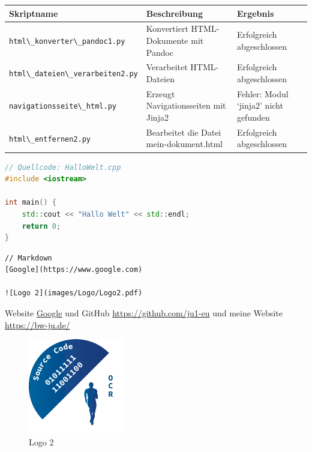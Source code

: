 \documentclass{vorlage-design-main}
\begin{document}
\begin{table}[ht]
  \begin{tabular}{@{}lll@{}}
\toprule
Skriptname
 & 
Beschreibung
 & 
Ergebnis
 \\
\midrule[\heavyrulewidth]
\verb|html\_konverter\_pandoc1.py| & Konvertiert
HTML-Dokumente mit Pandoc & Erfolgreich abgeschlossen \\
\verb|html\_dateien\_verarbeiten2.py| & Verarbeitet
HTML-Dateien & Erfolgreich abgeschlossen \\
\verb|navigationsseite\_html.py| & Erzeugt
Navigationsseiten mit Jinja2 & Fehler: Modul `jinja2' nicht gefunden \\
\verb|html\_entfernen2.py| & Bearbeitet die Datei
mein-dokument.html & Erfolgreich abgeschlossen \\
\bottomrule
\end{tabular}%
\end{table}

\newpage

\begin{lstlisting}[language={C++}]
// Quellcode: HalloWelt.cpp
#include <iostream>

int main() {
    std::cout << "Hallo Welt" << std::endl;
    return 0;
}
\end{lstlisting}

\begin{lstlisting}
// Markdown
[Google](https://www.google.com)

![Logo 2](images/Logo/Logo2.pdf)
\end{lstlisting}

Website \href{https://www.google.com}{Google} und GitHub
\url{https://github.com/ju1-eu} und meine Website
\url{https://bw-ju.de/}

\begin{figure}
\centering
\includegraphics[keepaspectratio]{images/Logo/Logo2.pdf}
\caption{Logo 2}
\end{figure}
\end{document}
